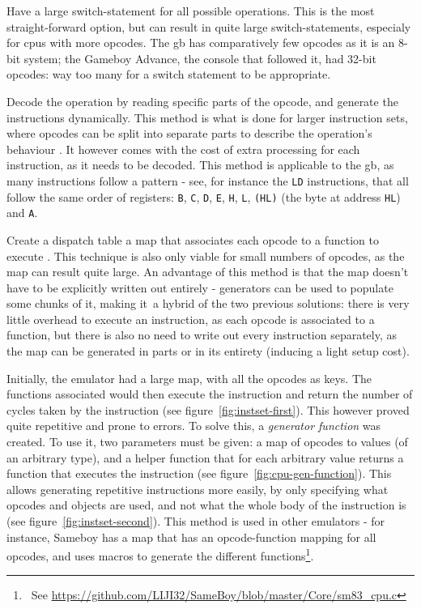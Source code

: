 \documentclass[11pt]{report}
\newcommand{\ftnt}[1]{\footnote{~See \url{#1}}}
\begin{document}
\begin{compactitem}
    \item Have a large switch-statement for all possible operations. This is the most straight-forward option, but can result in quite large switch-statements, especialy for \glspl{cpu} with more opcodes. The \gls{gb} has comparatively few opcodes as it is an 8-bit system; the Gameboy Advance, the console that followed it, had 32-bit opcodes: way too many for a switch statement to be appropriate.
    \item Decode the operation by reading specific parts of the opcode, and generate the instructions dynamically. This method is what is done for larger instruction sets, where opcodes can be split into separate parts to describe the operation's behaviour \cite[ARM CPU Reference]{gbatek}. It however comes with the cost of extra processing for each instruction, as it needs to be decoded. This method is applicable to the \gls{gb}, as many instructions follow a pattern - see, for instance the \texttt{LD} instructions, that all follow the same order of registers: \texttt{B}, \texttt{C}, \texttt{D}, \texttt{E}, \texttt{H}, \texttt{L}, \texttt{(HL)} (the byte at address \texttt{HL}) and \texttt{A}.
    \item Create a dispatch table a map that associates each opcode to a function to execute \cite{dispatch_table}. This technique is also only viable for small numbers of opcodes, as the map can result quite large. An advantage of this method is that the map doesn't have to be explicitly written out entirely - generators can be used to populate some chunks of it, making it a hybrid of the two previous solutions: there is very little overhead to execute an instruction, as each opcode is associated to a function, but there is also no need to write out every instruction separately, as the map can be generated in parts or in its entirety (inducing a light setup cost).
\end{compactitem}

Initially, the emulator had a large map, with all the opcodes as keys. The functions associated would then execute the instruction and return the number of cycles taken by the instruction (see figure~\ref{fig:instset-first}). This however proved quite repetitive and prone to errors. To solve this, a \textit{generator function} was created. To use it, two parameters must be given: a map of opcodes to values (of an arbitrary type), and a helper function that for each arbitrary value returns a function that executes the instruction (see figure~\ref{fig:cpu-gen-function}). This allows generating repetitive instructions more easily, by only specifying what opcodes and objects are used, and not what the whole body of the instruction is (see figure~\ref{fig:instset-second}). This method is used in other emulators - for instance, Sameboy has a map that has an opcode-function mapping for all opcodes, and uses macros to generate the different functions\ftnt{https://github.com/LIJI32/SameBoy/blob/master/Core/sm83\_cpu.c}.
\end{document}
